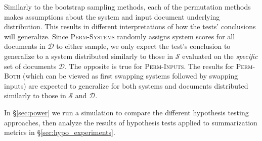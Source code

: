 Similarly to the bootstrap sampling methods, each of the permutation methods makes assumptions about the system and input document underlying distribution.
This results in different interpretations of how the tests' conclusions will generalize.
Since \textsc{Perm-Systems} randomly assigns system scores for all documents in $\mathcal{D}$ to either sample, we only expect the test's conclusion to generalize to a system distributed similarly to those in $\mathcal{S}$ evaluated on the \emph{specific} set of documents $\mathcal{D}$.
The opposite is true for \textsc{Perm-Inputs}.
The results for \textsc{Perm-Both} (which can be viewed as first swapping systems followed by swapping inputs) are expected to generalize for both systems and documents distributed similarly to those in $\mathcal{S}$ and $\mathcal{D}$.


In \S\ref{sec:power} we run a simulation to compare the different hypothesis testing approaches, then analyze the results of hypothesis tests applied to summarization metrics in \S\ref{sec:hypo_experiments}.




